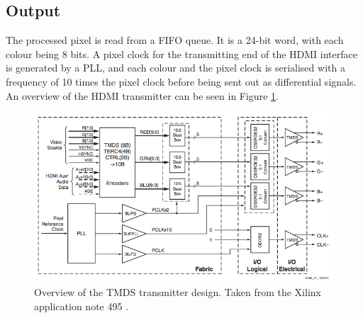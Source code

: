\subsection{Output}
The processed pixel is read from a FIFO queue. It is a 24-bit word, with each colour being 8 bits.
A pixel clock for the transmitting end of the HDMI interface is generated by a PLL,
and each colour and the pixel clock is serialised with a frequency of 10 times the pixel clock before being sent out as differential signals.
An overview of the HDMI transmitter can be seen in Figure \ref{fig:TMDSTransmitter}.

\begin{figure}[h!]
    \centering
    \includegraphics[width=\linewidth]{img/TMDStransmitterdesign.png}
    \caption[Overview of the TMDS transmitter design.]{Overview of the TMDS transmitter design. Taken from the Xilinx application note 495 \cite{xapp495}.}
    \label{fig:TMDSTransmitter}
\end{figure}
